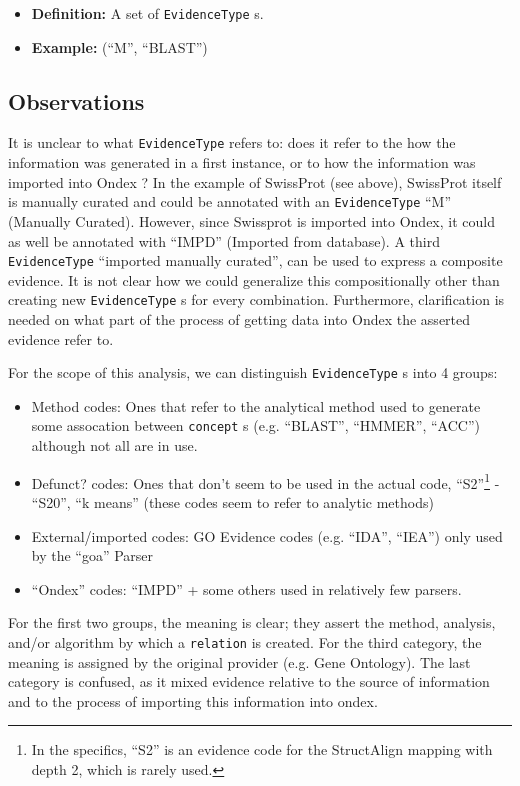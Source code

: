\documentclass[a4paper,10pt]{article}
\newcommand{\defn}[1]{\item\textbf{Definition: }#1\xspace}
\newcommand{\example}[1]{\item\textbf{Example: }#1\xspace}
\newcommand{\term}[1]{\texttt{#1}\xspace}
\begin{document}
\begin{itemize}

	\defn{A set of \term{EvidenceType}s.}
	
	\example{(``M'', ``BLAST'')}

\end{itemize}

\subsection{Observations}

It is unclear to what \term{EvidenceType} refers to: does it refer to the how the information was generated in a first instance, or to how the information was imported into Ondex ?
In the example of SwissProt (see above), SwissProt itself is manually curated and could be annotated with an \term{EvidenceType} ``M'' (Manually Curated).
However, since Swissprot is imported into Ondex, it could as well be annotated with ``IMPD'' (Imported from database).
A third \term{EvidenceType} ``imported manually curated'', can be used to express a composite evidence. It is not clear how we could generalize this compositionally other than creating new \term{EvidenceType}s for every combination. Furthermore, clarification is needed on what part of the process of getting data into Ondex the asserted evidence refer to.


\vskip 0.3cm
\noindent
For the scope of this analysis, we can distinguish \term{EvidenceType}s into 4 groups:
	\begin{itemize}
		\item Method codes: Ones that refer to the analytical method used to generate some assocation between \term{concept}s (e.g. ``BLAST'', ``HMMER'', ``ACC'') although not all are in use.
		\item Defunct? codes: Ones that don't seem to be used in the actual code, ``S2''\footnote{In the specifics, ``S2'' is an evidence code for the StructAlign mapping with depth 2, which is rarely used.} - ``S20'', ``k means'' (these codes seem to refer to analytic methods)
		\item External/imported codes: GO Evidence codes (e.g. ``IDA'', ``IEA'') only used by the ``goa'' Parser
		\item ``Ondex'' codes: ``IMPD'' + some others used in relatively few parsers.
	\end{itemize}
For the first two groups, the meaning is clear; they assert the method, analysis, and/or algorithm by which a \term{relation} is created. For the third category, the meaning is assigned by the original provider (e.g. Gene Ontology). The last category is confused, as it mixed evidence relative to the source of information and to the process of importing this information into ondex.
\vskip 0.3cm
\end{document}
